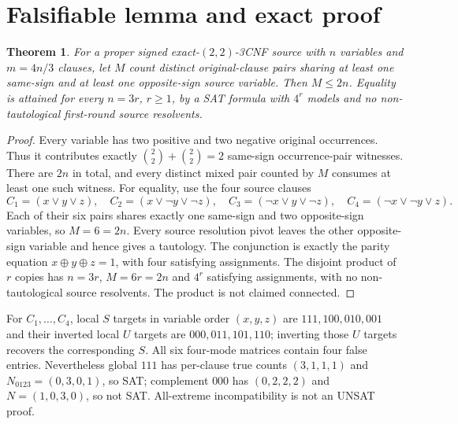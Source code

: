 \documentclass{article}
\newtheorem{theorem}{Theorem}
\begin{document}
\section{Falsifiable lemma and exact proof}
\begin{theorem}
For a proper signed exact-$(2,2)$-3CNF source with $n$ variables and $m=4n/3$ clauses, let $M$ count distinct original-clause pairs sharing at least one same-sign and at least one opposite-sign source variable. Then $M\le2n$. Equality is attained for every $n=3r$, $r\ge1$, by a SAT formula with $4^r$ models and no non-tautological first-round source resolvents.
\end{theorem}
\begin{proof}
Every variable has two positive and two negative original occurrences. Thus it contributes exactly $\binom22+\binom22=2$ same-sign occurrence-pair witnesses. There are $2n$ in total, and every distinct mixed pair counted by $M$ consumes at least one such witness.
For equality, use the four source clauses
\[
C_1=(x\vee y\vee z),\quad C_2=(x\vee\neg y\vee\neg z),\quad
C_3=(\neg x\vee y\vee\neg z),\quad C_4=(\neg x\vee\neg y\vee z).
\]
Each of their six pairs shares exactly one same-sign and two opposite-sign variables, so $M=6=2n$. Every source resolution pivot leaves the other opposite-sign variable and hence gives a tautology. The conjunction is exactly the parity equation $x\oplus y\oplus z=1$, with four satisfying assignments. The disjoint product of $r$ copies has $n=3r$, $M=6r=2n$ and $4^r$ satisfying assignments, with no non-tautological source resolvents. The product is not claimed connected.
\end{proof}
For $C_1,\ldots,C_4$, local $S$ targets in variable order $(x,y,z)$ are $111,100,010,001$ and their inverted local $U$ targets are $000,011,101,110$; inverting those $U$ targets recovers the corresponding $S$. All six four-mode matrices contain four false entries. Nevertheless global $111$ has per-clause true counts $(3,1,1,1)$ and $N_{0123}=(0,3,0,1)$, so SAT; complement $000$ has $(0,2,2,2)$ and $N=(1,0,3,0)$, so not SAT. All-extreme incompatibility is not an UNSAT proof.
\end{document}
